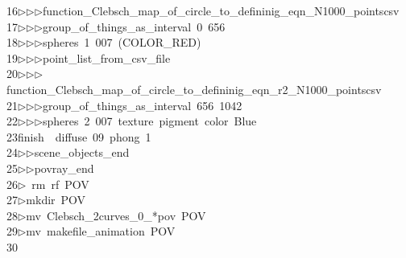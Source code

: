 \begin{tabbing}
16\>$\triangleright$\>$\triangleright$\>$\triangleright$\>function\_Clebsch\_map\_of\_circle\_to\_defininig\_eqn\_N1000\_pointscsv\ \\[0pt]
17\>$\triangleright$\>$\triangleright$\>$\triangleright$\>group\_of\_things\_as\_interval\ 0\ 656\ \\[0pt]
18\>$\triangleright$\>$\triangleright$\>$\triangleright$\>spheres\ 1\ 007\ (COLOR\_RED)\ \\[0pt]
19\>$\triangleright$\>$\triangleright$\>$\triangleright$\>point\_list\_from\_csv\_file\ \\[0pt]
20\>$\triangleright$\>$\triangleright$\>$\triangleright$\>function\_Clebsch\_map\_of\_circle\_to\_defininig\_eqn\_r2\_N1000\_pointscsv\ \\[0pt]
21\>$\triangleright$\>$\triangleright$\>$\triangleright$\>group\_of\_things\_as\_interval\ 656\ 1042\ \\[0pt]
22\>$\triangleright$\>$\triangleright$\>$\triangleright$\>spheres\ 2\ 007\ texture\ pigment\ color\ Blue\ \ \\[0pt]
23\>finish\ \ diffuse\ 09\ phong\ 1\ \\[0pt]
24\>$\triangleright$\>$\triangleright$\>scene\_objects\_end\ \\[0pt]
25\>$\triangleright$\>$\triangleright$\>povray\_end\\[0pt]
26\>$\triangleright$\>\ rm\ rf\ POV\\[0pt]
27\>$\triangleright$\>mkdir\ POV\\[0pt]
28\>$\triangleright$\>mv\ Clebsch\_2curves\_0\_*pov\ POV\\[0pt]
29\>$\triangleright$\>mv\ makefile\_animation\ POV\\[0pt]
30\>\end{tabbing}
